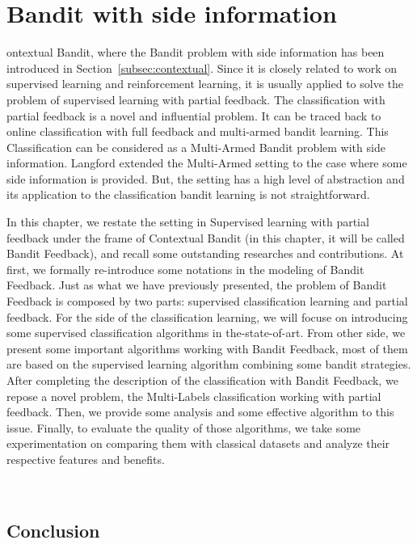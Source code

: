 %
%
\let\textcircled=\pgftextcircled
\chapter{Bandit with side information}
\label{chap:BF}

 ontextual Bandit, where the Bandit problem with side information has been introduced in Section~\ref{subsec:contextual}. Since it is closely related to work on supervised learning and reinforcement learning, it is usually applied to solve the problem of supervised learning with partial feedback. The classification with partial feedback is a novel and influential problem. It can be traced back to online classification with full feedback and multi-armed bandit learning. This Classification can be considered as a Multi-Armed Bandit problem with side information. Langford \cite{langford2008epoch} extended the Multi-Armed setting to the case where some side information is provided. But, the setting has a high level of abstraction and its application to the classification bandit learning is not straightforward. 
 
In this chapter, we restate the setting in Supervised learning with partial feedback under the frame of Contextual Bandit (in this chapter, it will be called Bandit Feedback), and recall some outstanding researches and contributions. 
At first, we formally re-introduce some notations in the modeling of Bandit Feedback. Just as what we have previously presented, the problem of Bandit Feedback is composed by two parts: supervised classification learning and partial feedback. 
For the side of the classification learning, we will focuse on introducing some supervised classification algorithms in the-state-of-art. From other side, we present some important algorithms working with Bandit Feedback, most of them are based on the supervised learning algorithm combining some bandit strategies. 
After completing the description of the classification with Bandit Feedback, we repose a novel problem, the Multi-Labels classification working with partial feedback. Then, we provide some analysis and some effective algorithm to this issue. 
Finally, to evaluate the quality of those algorithms, we take some experimentation on comparing them with classical datasets and analyze their respective features and benefits.


\
\
\
\
\
\






\section{Conclusion}
